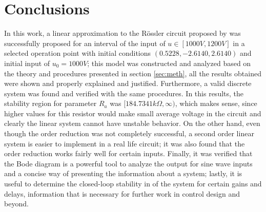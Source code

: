 \section{Conclusions}\label{sec:conc}
In this work, a linear approximation to the Rössler circuit proposed by \cite{canals2014random} was successfully proposed for an interval of the input of $u \in [1000V, 1200V]$ in a selected operation point with initial conditions $(0.5228,-2.6140,2.6140)$ and initial input of $u_0 = 1000V$; this model was constructed and analyzed based on the theory and procedures presented in section \ref{sec:meth}, all the results obtained were shown and properly explained and justified. Furthermore, a valid discrete system was found and verified with the same procedures. In this results, the stability region for parameter $R_a$ was $[184.7341k\Omega,\infty)$, which makes sense, since higher values for this resistor would make small average voltage in the circuit and clearly the linear system cannot have unstable behavior. On the other hand, even though the order reduction was not completely successful, a second order linear system is easier to implement in a real life circuit; it was also found that the order reduction works fairly well for certain inputs. Finally, it was verified that the Bode diagram is a powerful tool to analyze the output for sine wave inputs and a concise way of presenting the information about a system; lastly, it is useful to determine the closed-loop stability in of the system for certain gains and delays, information that is necessary for further work in control design and beyond. 
 

